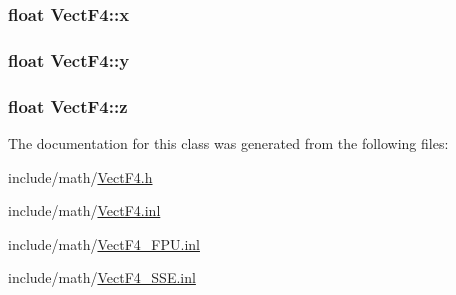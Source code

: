 \hypertarget{classVectF4_a0eae0277b6f418b6455a45030824c271}{
\subsubsection[{x}]{\setlength{\rightskip}{0pt plus 5cm}float Vect\-F4\-::x}}\label{classVectF4_a0eae0277b6f418b6455a45030824c271}
\hypertarget{classVectF4_a9c3f2f0998e49e2039768ce8e64c1f91}{
\subsubsection[{y}]{\setlength{\rightskip}{0pt plus 5cm}float Vect\-F4\-::y}}\label{classVectF4_a9c3f2f0998e49e2039768ce8e64c1f91}
\hypertarget{classVectF4_a7fd880f9637591664713a14796cc06cd}{
\subsubsection[{z}]{\setlength{\rightskip}{0pt plus 5cm}float Vect\-F4\-::z}}\label{classVectF4_a7fd880f9637591664713a14796cc06cd}


The documentation for this class was generated from the following files\-:\begin{DoxyCompactItemize}
\item 
include/math/\hyperlink{VectF4_8h}{Vect\-F4.\-h}\item 
include/math/\hyperlink{VectF4_8inl}{Vect\-F4.\-inl}\item 
include/math/\hyperlink{VectF4__FPU_8inl}{Vect\-F4\-\_\-\-F\-P\-U.\-inl}\item 
include/math/\hyperlink{VectF4__SSE_8inl}{Vect\-F4\-\_\-\-S\-S\-E.\-inl}\end{DoxyCompactItemize}
